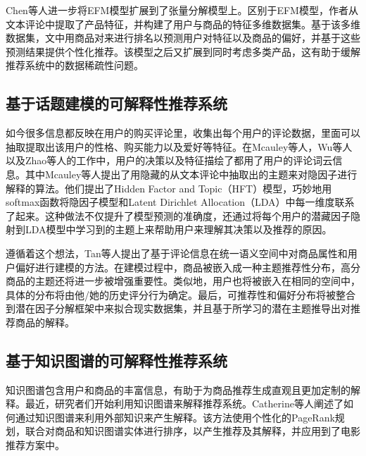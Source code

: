 
Chen等人进一步将EFM模型扩展到了张量分解模型上。区别于EFM模型，作者从文本评论中提取了产品特征，并构建了用户与商品的特征多维数据集。基于该多维数据集，文中用商品对来进行排名以预测用户对特征以及商品的偏好，并基于这些预测结果提供个性化推荐。该模型之后又扩展到同时考虑多类产品，这有助于缓解推荐系统中的数据稀疏性问题。

\subsection{基于话题建模的可解释性推荐系统}
如今很多信息都反映在用户的购买评论里，收集出每个用户的评论数据，里面可以抽取提取出该用户的性格、购买能力以及爱好等特征。在Mcauley等人，Wu等人以及Zhao等人的工作中，用户的决策以及特征描绘了都用了用户的评论词云信息。其中Mcauley等人提出了用隐藏的从文本评论中抽取出的主题来对隐因子进行解释的算法。他们提出了Hidden Factor and Topic（HFT）模型，巧妙地用softmax函数将隐因子模型和Latent Dirichlet Allocation（LDA）中每一维度联系了起来。这种做法不仅提升了模型预测的准确度，还通过将每个用户的潜藏因子隐射到LDA模型中学习到的主题上来帮助用户来理解其决策以及推荐的原因。

遵循着这个想法，Tan等人提出了基于评论信息在统一语义空间中对商品属性和用户偏好进行建模的方法。在建模过程中，商品被嵌入成一种主题推荐性分布，高分商品的主题还将进一步被增强重要性。类似地，用户也将被嵌入在相同的空间中，具体的分布将由他/她的历史评分行为确定。最后，可推荐性和偏好分布将被整合到潜在因子分解框架中来拟合现实数据集，并且基于所学习的潜在主题推导出对推荐商品的解释。

\subsection{基于知识图谱的可解释性推荐系统}
知识图谱包含用户和商品的丰富信息，有助于为商品推荐生成直观且更加定制的解释。最近，研究者们开始利用知识图谱来解释推荐系统。Catherine等人阐述了如何通过知识图谱来利用外部知识来产生解释。该方法使用个性化的PageRank规划，联合对商品和知识图谱实体进行排序，以产生推荐及其解释，并应用到了电影推荐方案中。

